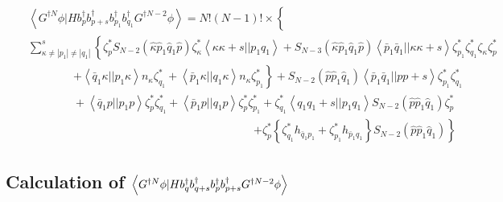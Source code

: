 \begin{eqnarray}
&&\left\langle G^{\dagger N}\phi |Hb_{p}^{\dagger }b_{p+s}^{\dagger
}b_{p_{1}}^{\dagger }b_{q_{1}}^{\dagger }G^{\dagger N-2}\phi \right\rangle
=N!\left( N-1\right) !\times \left\{ {}\right.  \nonumber \\
&&\sum_{\kappa \neq \left| p_{1}\right| \neq \left| q_{1}\right|
}^{s}\left\{ \zeta _{p}^{\ast }S_{N-2}\left( \hat{\kappa}\hat{p}_{1}\hat{q}%
_{1}\hat{p}\right) \zeta _{\kappa }^{\ast }\left\langle \kappa \kappa
+s||p_{1}q_{1}\right\rangle +S_{N-3}\left( \hat{\kappa}\hat{p}_{1}\hat{q}_{1}%
\hat{p}\right) \left\langle \bar{p}_{1}\bar{q}_{1}||\kappa \kappa
+s\right\rangle \zeta _{p_{1}}^{\ast }\zeta _{q_{1}}^{\ast }\zeta _{\kappa
}\zeta _{p}^{\ast }\right.  \nonumber \\
&&\qquad \qquad \left. +\left\langle \bar{q}_{1}\kappa ||p_{1}\kappa
\right\rangle n_{\kappa }\zeta _{q_{1}}^{\ast }+\left\langle \bar{p}%
_{1}\kappa ||q_{1}\kappa \right\rangle n_{\kappa }\zeta _{p_{1}}^{\ast
}\right\} +S_{N-2}\left( \hat{p}\hat{p}_{1}\hat{q}_{1}\right) \left\langle 
\bar{p}_{1}\bar{q}_{1}||pp+s\right\rangle \zeta _{p_{1}}^{\ast }\zeta
_{q_{1}}^{\ast }  \nonumber \\
&&\qquad \qquad +\left\langle \bar{q}_{1}p||p_{1}p\right\rangle \zeta
_{p}^{\ast }\zeta _{q_{1}}^{\ast }+\left\langle \bar{p}_{1}p||q_{1}p\right%
\rangle \zeta _{p}^{\ast }\zeta _{p_{1}}^{\ast }+\zeta _{q_{1}}^{\ast
}\left\langle q_{1}q_{1}+s||p_{1}q_{1}\right\rangle S_{N-2}\left( \hat{p}%
\hat{p}_{1}\hat{q}_{1}\right) \zeta _{p}^{\ast }  \nonumber \\
&&\qquad \qquad \qquad \qquad \qquad \qquad \qquad \qquad \qquad \qquad
\left. +\zeta _{p}^{\ast }\left\{ \zeta _{q_{1}}^{\ast }h_{\bar{q}%
_{1}p_{1}}+\zeta _{p_{1}}^{\ast }h_{\bar{p}_{1}q_{1}}\right\} S_{N-2}\left( 
\hat{p}\hat{p}_{1}\hat{q}_{1}\right) \right\}
\end{eqnarray}

\subsection{Calculation of $\left\langle G^{\dagger N}\protect\phi %
|Hb_{q}^{\dagger }b_{q+s}^{\dagger }b_{p}^{\dagger }b_{p+s}^{\dagger
}G^{\dagger N-2}\protect\phi \right\rangle $}

